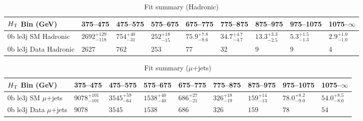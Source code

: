 \documentclass[8pt]{article}
\def\scalht{\mbox{$H_{\rm{T}}$}\xspace}
\newcommand\T{\rule{0pt}{2.6ex}}
\begin{document}
\begin{table}[ht!]
\caption{Fit summary (Hadronic)}
\label{tab:ensemble-summary}
\centering
\begin{tabular}{ lllllllll }

\hline
\scalht Bin (GeV)       & 375--475                       & 475--575                       & 575--675                       & 675--775                       & 775--875                       & 875--975                       & 975--1075                      & 1075--$\infty$                 \\ [1.000000ex]
\hline
0b le3j SM Hadronic\T   & $2692^{+129}_{-118}$           & $754^{+40}_{-31}$              & $252^{+18}_{-15}$              & $75.9^{+7.8}_{-8.6}$           & $34.7^{+4.7}_{-4.7}$           & $13.3^{+3.3}_{-2.5}$           & $5.3^{+1.5}_{-1.3}$            & $2.9^{+1.0}_{-1.0}$            \\ 
0b le3j Data Hadronic\T & $2627$                         & $762$                          & $253$                          & $77$                           & $32$                           & $9$                            & $9$                            & $4$                            \\ 
\hline

\end{tabular}
\end{table}
\begin{table}[ht!]
\caption{Fit summary ($\mu$+jets)}
\label{tab:ensemble-summary}
\centering
\begin{tabular}{ lllllllll }

\hline
\scalht Bin (GeV)       & 375--475                       & 475--575                       & 575--675                       & 675--775                       & 775--875                       & 875--975                       & 975--1075                      & 1075--$\infty$                 \\ [1.000000ex]
\hline
0b le3j SM $\mu$+jets\T & $9078^{+101}_{-101}$           & $3545^{+59}_{-64}$             & $1538^{+40}_{-40}$             & $686^{+27}_{-21}$              & $326^{+18}_{-19}$              & $159^{+14}_{-13}$              & $78.0^{+8.2}_{-9.0}$           & $54.0^{+8.5}_{-8.0}$           \\ 
0b le3j Data $\mu$+jets\T & $9078$                         & $3545$                         & $1538$                         & $686$                          & $326$                          & $159$                          & $78$                           & $54$                           \\ 
\hline

\end{tabular}
\end{table}
\end{document}
